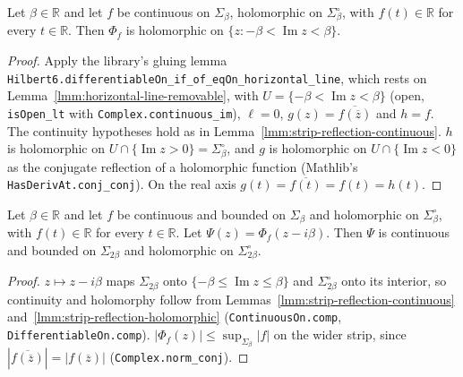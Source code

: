 \begin{lemma}
    \label{lmm:strip-reflection-holomorphic}
    \leanok
    Let $\beta \in \mathbb{R}$ and let $f$ be continuous on $\Sigma_\beta$, holomorphic on $\Sigma^\circ_\beta$, with $f(t) \in \mathbb{R}$ for every $t \in \mathbb{R}$. Then $\Phi_f$ is holomorphic on $\{ z : -\beta < \operatorname{Im} z < \beta \}$.
\end{lemma}
\begin{proof}
    \leanok
    Apply the library's gluing lemma \texttt{Hilbert6.differentiableOn\_if\_of\_eqOn\_horizontal\_line}, which rests on Lemma~\ref{lmm:horizontal-line-removable}, with $U = \{-\beta < \operatorname{Im} z < \beta\}$ (open, \texttt{isOpen\_lt} with \texttt{Complex.continuous\_im}), $\ell = 0$, $g(z) = \overline{f(\overline{z})}$ and $h = f$. The continuity hypotheses hold as in Lemma~\ref{lmm:strip-reflection-continuous}. $h$ is holomorphic on $U \cap \{\operatorname{Im} z > 0\} = \Sigma^\circ_\beta$, and $g$ is holomorphic on $U \cap \{\operatorname{Im} z < 0\}$ as the conjugate reflection of a holomorphic function (Mathlib's \texttt{HasDerivAt.conj\_conj}). On the real axis $g(t) = \overline{f(t)} = f(t) = h(t)$.
\end{proof}

\begin{lemma}
    \label{lmm:strip-shifted-reflection-regular}
    \leanok
    Let $\beta \in \mathbb{R}$ and let $f$ be continuous and bounded on $\Sigma_\beta$ and holomorphic on $\Sigma^\circ_\beta$, with $f(t) \in \mathbb{R}$ for every $t \in \mathbb{R}$. Let $\Psi(z) = \Phi_f(z - i\beta)$. Then $\Psi$ is continuous and bounded on $\Sigma_{2\beta}$ and holomorphic on $\Sigma^\circ_{2\beta}$.
\end{lemma}
\begin{proof}
    \leanok
    $z \mapsto z - i\beta$ maps $\Sigma_{2\beta}$ onto $\{-\beta \le \operatorname{Im} z \le \beta\}$ and $\Sigma^\circ_{2\beta}$ onto its interior, so continuity and holomorphy follow from Lemmas~\ref{lmm:strip-reflection-continuous} and~\ref{lmm:strip-reflection-holomorphic} (\texttt{ContinuousOn.comp}, \texttt{DifferentiableOn.comp}). $|\Phi_f(z)| \le \sup_{\Sigma_\beta}|f|$ on the wider strip, since $|\overline{f(\overline{z})}| = |f(\overline{z})|$ (\texttt{Complex.norm\_conj}).
\end{proof}

